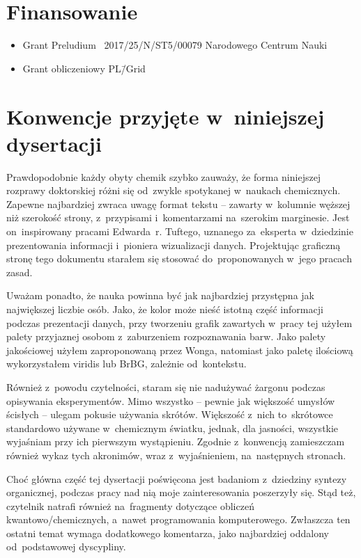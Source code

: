 \section{Finansowanie}
\begin{fullwidth}
\begin{itemize}
  \item Grant Preludium \textnumero~2017/25/N/ST5/00079 Narodowego Centrum Nauki
  \item Grant obliczeniowy PL\=/Grid
\end{itemize}
\end{fullwidth}


\section{Konwencje przyjęte w~niniejszej dysertacji}

Prawdopodobnie każdy obyty chemik szybko zauważy, że forma niniejszej rozprawy doktorskiej różni się od~zwykle spotykanej w~naukach chemicznych.
Zapewne najbardziej zwraca uwagę format tekstu \--- zawarty w~kolumnie węższej niż szerokość strony, z~przypisami i~komentarzami na~szerokim marginesie.
Jest on~inspirowany pracami\autocite{Tufte2001,Tufte1990,Tufte1997,Tufte2006} Edwarda~r. Tuftego,
uznanego za~eksperta w~dziedzinie prezentowania informacji i~pioniera wizualizacji danych\autocite{Yaffa2011}.
Projektując graficzną stronę tego dokumentu starałem się stosować do~proponowanych w~jego pracach zasad.

Uważam ponadto, że nauka powinna być jak najbardziej przystępna jak największej liczbie osób.
Jako, że kolor może nieść istotną część informacji podczas prezentacji danych,
przy tworzeniu grafik zawartych w~pracy tej użyłem palety przyjaznej osobom z~zaburzeniem rozpoznawania barw.
Jako palety jakościowej użyłem zaproponowaną przez Wonga\autocite{wong11},
natomiast jako paletę ilościową wykorzystałem viridis\autocite{Smith2015} lub BrBG, zależnie od~kontekstu.

Również z~powodu czytelności, staram się nie nadużywać żargonu podczas opisywania eksperymentów.
Mimo wszystko \--- pewnie jak większość umysłów ścisłych \--- ulegam pokusie używania skrótów.
Większość z~nich to~skrótowce standardowo używane w~chemicznym światku,
jednak, dla jasności, wszystkie wyjaśniam przy ich pierwszym wystąpieniu.
Zgodnie z~konwencją zamieszczam również wykaz tych akronimów, wraz z~wyjaśnieniem, na~następnych stronach.

Choć główna część tej dysertacji poświęcona jest badaniom z~dziedziny syntezy organicznej,
podczas pracy nad nią moje zainteresowania poszerzyły się.
Stąd też, czytelnik natrafi również na~fragmenty dotyczące obliczeń kwantowo\-/chemicznych, a~nawet programowania komputerowego.
Zwłaszcza ten ostatni temat wymaga dodatkowego komentarza, jako najbardziej oddalony od~podstawowej dyscypliny.

